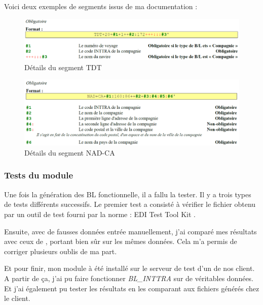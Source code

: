 Voici deux exemples de segments issus de ma documentation :
\begin{figure}[h!]
	\begin{center}
		\includegraphics[scale=.54]{Contenu/Synthese_SeptembreAvril/Images/Segment_TDT.png}
	\end{center}

	\caption{Détails du segment \og TDT \fg}
	\label{segment_TDT}
\end{figure}
\begin{figure}[h!]
	\begin{center}
		\includegraphics[scale=.54]{Contenu/Synthese_SeptembreAvril/Images/Segment_NAD_CA.png}
	\end{center}

	\caption{Détails du segment \og NAD-CA \fg}
	\label{segment_NAD_CA}
\end{figure}

\subsubsection{Tests du module}
Une fois la génération des BL fonctionnelle, il a fallu la tester. Il y a trois types de tests différents successifs. Le premier test a consisté à vérifier le fichier obtenu par un outil de test fourni par la norme : \og EDI Test Tool Kit \fg.

Ensuite, avec de fausses données entrée manuellement, j'ai comparé mes résultats avec ceux de \pireus, portant bien sûr sur les mêmes données. Cela m'a permis de corriger plusieurs oublis de ma part.

Et pour finir, mon module à été installé sur le serveur de test d'un de nos client. A partir de ça, j'ai pu faire fonctionner \emph{BL\_INTTRA} sur de véritables données. Et j'ai également pu tester les résultats en les comparant aux fichiers générés chez le client.

